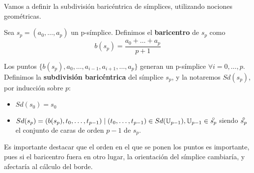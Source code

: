 Vamos a definir la subdivisión baricéntrica de símplices, utilizando nociones geométricas.

\begin{definition}
  Sea $s_p = (a_0, \dots, a_p)$ un p-símplice. Definimos el \textbf{baricentro} de $s_p$ como
  \[b(s_p) = \frac{a_0 + \dots + a_p}{p+1}\]
\end{definition}

Los puntos $\{b(s_p), a_0, \dots, a_{i-1}, a_{i+1}, \dots, a_p\}$ generan un p-símplice $\forall i = 0, \dots, p$.
Definimos la \textbf{subdivisión baricéntrica} del símplice $s_p$, y la notaremos $Sd(s_p)$, por inducción sobre $p$:
\begin{itemize}
  \item $Sd(s_0) = s_0$
  \item $Sd(s_p) = (b(s_p), t_0, \dots, t_{p-1}) \mid (t_0, \dots, t_{p-1}) \in Sd(\U_{p-1}), \U_{p-1} \in \interior{s_p}$
        siendo $\interior{s_p}$ el conjunto de caras de orden $p-1$ de $s_p$.
\end{itemize}

\begin{remark}
  Es importante destacar que el orden en el que se ponen los puntos es importante, pues si el baricentro fuera en otro lugar,
  la orientación del símplice cambiaría, y afectaría al cálculo del borde.
\end{remark}

